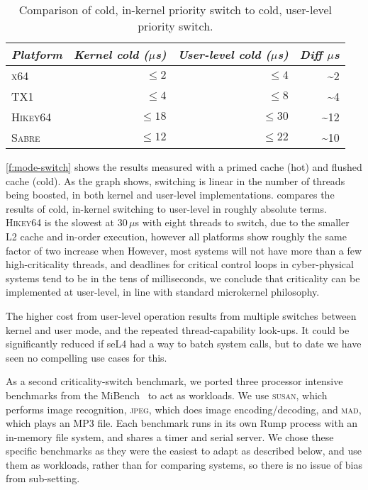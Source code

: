 \begin{table}[t]\centering
    \begin{tabular}{lrrr}\toprule
        \emph{Platform}     & \emph{Kernel cold ($\mu$s)} & \emph{User-level cold ($\mu$s)} & \emph{Diff $\mu$s} \\\midrule
        \textsc{x64}    & $\leq2$ & $\leq4$ & \textasciitilde2 \\
        \textsc{TX1}    & $\leq4$ & $\leq8$ & \textasciitilde4 \\
        \textsc{Hikey64}    & $\leq18$ & $\leq30$ & \textasciitilde12 \\
        \textsc{Sabre}    & $\leq12$ & $\leq22$ & \textasciitilde10 \\
        \bottomrule
\end{tabular}
\caption[Comparison of kernel and user-level priority switches]{Comparison of cold, in-kernel
priority switch to cold, user-level priority switch.}
\label{t:cold-prio-switch}
\end{table}


\autoref{f:mode-switch} shows the results measured with a primed cache (hot) and flushed cache (cold).
As the graph shows, switching is linear in the number of threads being boosted, in both kernel and
user-level implementations.
 compares the results of cold, in-kernel switching to user-level in roughly
absolute terms. \textsc{Hikey64} is the slowest at 30\,\(\mu\)s with eight threads to switch,
due to the smaller L2 cache and
in-order execution, however all platforms show roughly the same factor of two increase when
However, most systems will not have more than a few high-criticality threads, and deadlines for critical control loops in
cyber-physical systems tend to be in the tens of milliseconds, we
conclude that criticality can be implemented at user-level, in line with standard microkernel philosophy.

The higher cost from user-level operation results from  multiple
switches between kernel and user mode, and the repeated
thread-capability look-ups. It could be significantly reduced if seL4
had a way to batch system calls, but to date we have seen no compelling use cases for this.

As a second criticality-switch benchmark, we ported three processor intensive 
benchmarks from the MiBench~\citep{Guthaus_REAMB_01} to act as workloads. 
We use \textsc{susan}, which performs image recognition, \textsc{jpeg}, which does image
encoding/decoding, and \textsc{mad}, which plays an MP3 file.
Each benchmark runs in its own Rump process
with an in-memory file system, and shares a timer and serial server.
 We chose these specific
benchmarks as they were the easiest to adapt as described below, and use them as workloads,
rather than for comparing systems, so there is no issue of bias from sub-setting.

